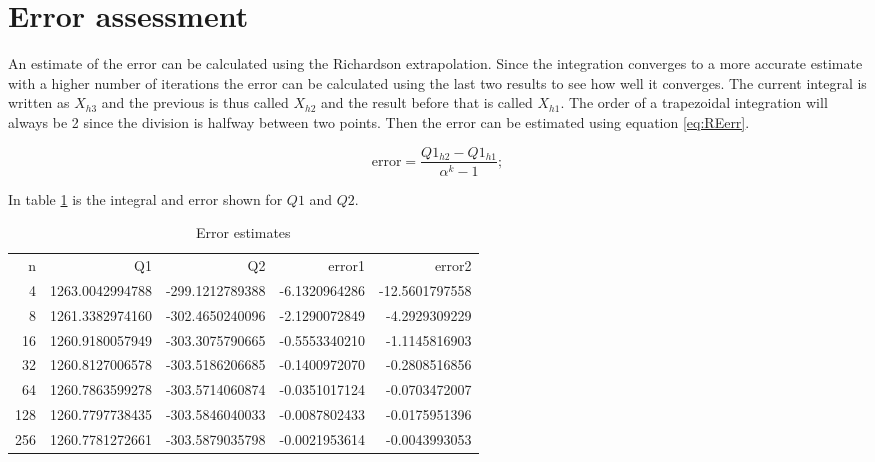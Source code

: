 \section{Error assessment}

An estimate of the error can be calculated using the Richardson extrapolation.
Since the integration converges to a more accurate estimate with a higher number of iterations the error can be calculated using the last two results to see how well it converges.
The current integral is written as \(X_{h3}\) and the previous is thus called \(X_{h2}\) and the result before that is called \(X_{h1}\).
The order of a trapezoidal integration will always be 2 since the division is halfway between two points.
Then the error can be estimated using equation \ref{eq:REerr}.


\begin{equation}
    \text{error} = \frac{Q1_{h2}-Q1_{h1}}{\alpha^{k}-1};
    \label{eq:REerr}
\end{equation}

In table \ref{tb:error_estimate} is the integral and error shown for \(Q1\) and \(Q2\).
\renewcommand\arraystretch{1}
\begin{table}[h]
\centering
\begin{tabular}{*{5}{r}}  
  n&                 Q1&                     Q2&                      error1&                 error2\\
  4&    1263.0042994788&        -299.1212789388&               -6.1320964286&         -12.5601797558\\
  8&    1261.3382974160&        -302.4650240096&               -2.1290072849&          -4.2929309229\\
 16&    1260.9180057949&        -303.3075790665&               -0.5553340210&          -1.1145816903\\
 32&    1260.8127006578&        -303.5186206685&               -0.1400972070&          -0.2808516856\\
 64&    1260.7863599278&        -303.5714060874&               -0.0351017124&          -0.0703472007\\
128&    1260.7797738435&        -303.5846040033&               -0.0087802433&          -0.0175951396\\
256&    1260.7781272661&        -303.5879035798&               -0.0021953614&          -0.0043993053\\
\end{tabular}
\caption{Error estimates}
\label{tb:error_estimate}
\end{table}
